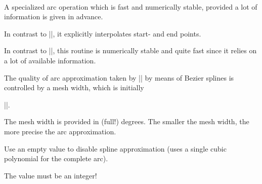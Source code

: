 \begin{command}{\pgfpatharctoprecomputed{}\\}
	A specialized arc operation which is fast and numerically stable, provided a lot of information is given in advance.

	In contrast to |\pgfpatharc|, it explicitly interpolates start- and end points.

	In contrast to |\pgfpatharcto|, this routine is numerically stable and quite fast since it relies on a lot of available information.
\begin{codeexample}[]
\end{codeexample}

  	\begin{command}{\pgfpatharctomaxstepsize}
	The quality of arc approximation taken by |\pgfpatharctoprecomputed| by means of Bezier splines is     %
	controlled by a mesh width, which is initially

	|\def\pgfpatharctoprecomputed{45}|.

	The mesh width is provided in (full!) degrees. The smaller the mesh
	width, the more precise the arc approximation.

	Use an empty value to disable spline approximation (uses a single
	cubic polynomial for the complete arc).

	The value must be an integer!
	\end{command}
\end{command}

